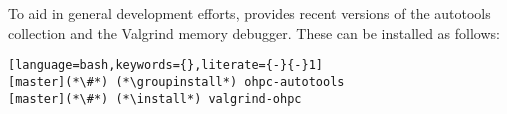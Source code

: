 To aid in general development efforts, \OHPC{} provides recent versions of the \GNU{}
autotools collection and the Valgrind memory debugger. These can be installed as follows:

\begin{lstlisting}[language=bash,keywords={},literate={-}{-}1]
[master](*\#*) (*\groupinstall*) ohpc-autotools
[master](*\#*) (*\install*) valgrind-ohpc
\end{lstlisting}
